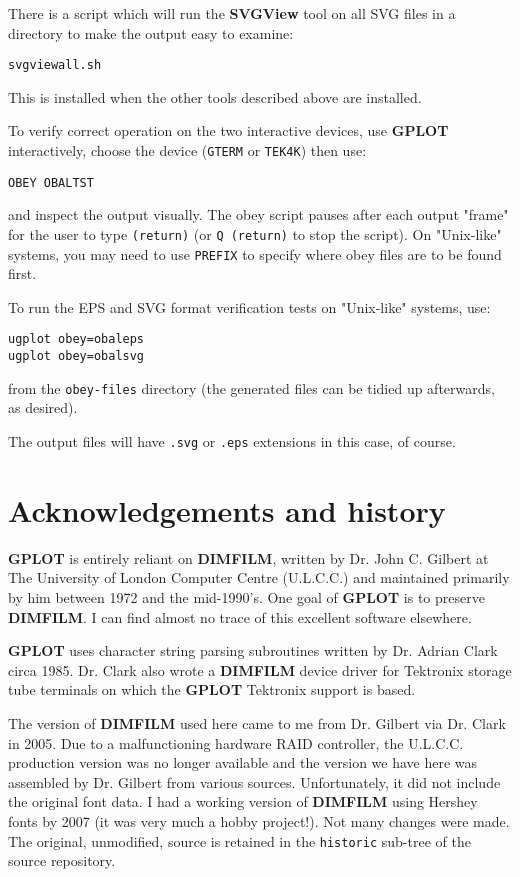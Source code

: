 \documentclass[a4paper,twoside,11pt]{article}
\newcommand{\newpara}{\par\vspace{4mm}\noindent}
\begin{document}
\newpara
There is a script which will run the \textbf{SVGView} tool on all SVG
files in a directory to make the output easy to examine:
\begin{lstlisting}
svgviewall.sh
\end{lstlisting}
This is installed when the other tools described above are
installed.

\newpara
To verify correct operation on the two interactive devices,
use \textbf{GPLOT} interactively, choose the device
(\texttt{GTERM} or \texttt{TEK4K}) then use:
\begin{lstlisting}
OBEY OBALTST
\end{lstlisting}
and inspect the output visually. The obey script pauses
after each output "frame" for the user to type \texttt{(return)}
(or \texttt{Q (return)} to stop the script). On "Unix-like"
systems, you may need to use \texttt{PREFIX} to specify where obey
files are to be found first.

\newpara
To run the EPS and SVG format verification tests on
"Unix-like" systems, use:
\begin{lstlisting}
ugplot obey=obaleps
ugplot obey=obalsvg
\end{lstlisting}
from the \texttt{obey-files} directory (the generated
files can be tidied
up afterwards, as desired).

\newpara
The output files will have \texttt{.svg} or \texttt{.eps} extensions in 
this case, of course.



\section{Acknowledgements and history}
\newpara
\textbf{GPLOT} is entirely reliant on \textbf{DIMFILM}, written by Dr. John C. Gilbert at The University of London
Computer Centre (U.L.C.C.) and maintained primarily by him between 1972 and the mid-1990's. One goal of \textbf{GPLOT} is to
preserve \textbf{DIMFILM}. I can find almost no trace of this excellent software elsewhere.

\newpara
\textbf{GPLOT} uses character
string parsing subroutines written by Dr. Adrian Clark circa 1985. Dr. Clark also wrote a \textbf{DIMFILM} device
driver for Tektronix storage tube terminals on which the \textbf{GPLOT} Tektronix support
is based.

\newpara
The version of \textbf{DIMFILM} used here came to me from Dr. Gilbert via Dr. Clark in 2005. Due to a malfunctioning hardware
RAID controller, the U.L.C.C. production version was no longer available and the version we have here
was assembled by Dr. Gilbert from various sources. Unfortunately, it did not include the original font data. I had a
working version of \textbf{DIMFILM} using Hershey fonts by 2007 (it was very much a hobby project!). Not many changes were made.
The original, unmodified, source is retained in the \texttt{historic} sub-tree of the source repository.
\end{document}
